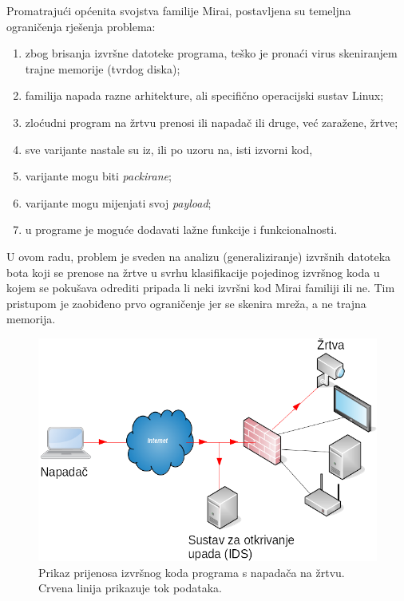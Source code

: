 Promatrajući općenita svojstva familije Mirai, postavljena su temeljna
ograničenja rješenja problema:
\begin{enumerate}
    \itemsep0em 
    \item zbog brisanja izvršne datoteke programa, teško je pronaći virus
skeniranjem trajne memorije (tvrdog diska);
    \item familija napada razne arhitekture, ali specifično operacijski sustav
    Linux;
    \item zloćudni program na žrtvu prenosi ili napadač ili druge, već zaražene,
    žrtve;
    \item sve varijante nastale su iz, ili po uzoru na, isti izvorni kod,
    \item varijante mogu biti \textit{packirane};
    \item varijante mogu mijenjati svoj \textit{payload};
    \item u programe je moguće dodavati lažne funkcije i funkcionalnosti.

\end{enumerate}

U ovom radu, problem je sveden na analizu (generaliziranje) izvršnih datoteka 
bota koji se prenose na žrtve u svrhu klasifikacije pojedinog izvršnog koda u 
kojem se pokušava odrediti pripada li neki izvršni kod Mirai familiji ili ne.
Tim pristupom je zaobiđeno prvo ograničenje jer se skenira mreža, a ne trajna
memorija. 

\begin{figure}[htb]
    \centering
    \includegraphics[scale=0.5]{images/IDS_napad.png}
    \caption{Prikaz prijenosa izvršnog koda programa s napadača na žrtvu.
    Crvena linija prikazuje tok podataka.}
    \label{fig:ids_napad}
\end{figure}


